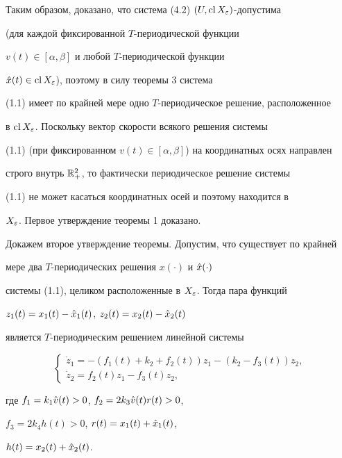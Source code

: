 Таким образом, доказано, что система (4.2) $(U,\operatorname{cl} X_{\varepsilon})$-допустима


(для каждой фиксированной $T$-периодической функции


$v(t)\in [\alpha,\beta]$ и любой $T$-периодической функции


$\Hat x(t) \in\operatorname{cl} X_{\varepsilon}$), поэтому в силу теоремы 3 система


(1.1) имеет по крайней мере одно $T$-периодическое решение, расположенное


в $\operatorname{cl} X_{\varepsilon}$. Поскольку вектор скорости всякого решения системы


(1.1) (при фиксированном $v(t)\in [\alpha,\beta]$) на координатных осях направлен


строго внутрь $\Bbb R_{+}^2$, то фактически периодическое решение системы


(1.1) не может касаться координатных осей и поэтому находится в


$X_{\varepsilon}$. Первое утверждение теоремы 1 доказано.





Докажем второе утверждение теоремы. Допустим, что существует по крайней


мере два $T$-периодических решения $x(\cdot)$ и $\Hat x(\cdot)$


системы (1.1), целиком расположенные в $X_{\varepsilon}$. Тогда пара функций


$z_1(t)=x_1(t) - \Hat x_1(t)$, $z_2(t)=x_2(t) - \Hat x_2(t)$


является $T$-периодическим решением линейной системы


%


\begin{equation}


\begin{cases}


\Dot z_1= - (f_1(t) + k_2 + f_2(t))z_1 - (k_2 - f_3(t))z_2, \\


\Dot z_2= f_2(t)z_1 - f_3(t)z_2,


\end{cases}


\end{equation}


%


где $f_1=k_1\Hat v(t)>0$, $f_2=2k_3\Hat v(t)r(t) > 0$,


$f_3=2k_4h(t) > 0$, $r(t)=x_1(t) + \Hat x_1(t)$,


$h(t)=x_2(t) + \Hat x_2(t)$.


